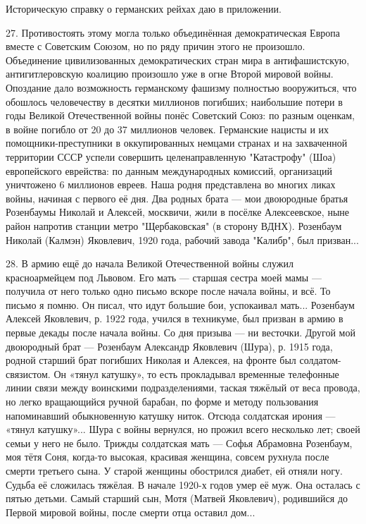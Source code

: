 Историческую справку о германских рейхах даю в приложении.

27. Противостоять этому могла только объединённая демократическая Европа вместе с Советским Союзом, но по ряду причин этого не произошло. Объединение цивилизованных демократических стран мира в антифашистскую, антигитлеровскую коалицию произошло уже в огне Второй мировой войны. Опоздание дало возможность германскому фашизму полностью вооружиться, что обошлось человечеству в десятки миллионов погибших; наибольшие потери в годы Великой Отечественной войны понёс Советский Союз: по разным оценкам, в войне погибло от 20 до 37 миллионов человек. Германские нацисты и их помощники-преступники в оккупированных немцами странах и на захваченной территории СССР успели совершить целенаправленную "Катастрофу" (Шоа) европейского еврейства: по данным международных комиссий, организаций уничтожено 6 миллионов евреев. Наша родня представлена во многих ликах войны, начиная с первого её дня. Два родных брата — мои двоюродные братья Розенбаумы Николай и Алексей, москвичи, жили в посёлке Алексеевское, ныне район напротив станции метро "Щербаковская" (в сторону ВДНХ). Розенбаум Николай (Калмэн) Яковлевич, 1920 года, рабочий завода "Калибр", был призван...

28. В армию ещё до начала Великой Отечественной войны служил красноармейцем под Львовом. Его мать — старшая сестра моей мамы — получила от него только одно письмо вскоре после начала войны, и всё. То письмо я помню. Он писал, что идут большие бои, успокаивал мать... Розенбаум Алексей Яковлевич, р. 1922 года, учился в техникуме, был призван в армию в первые декады после начала войны. Со дня призыва — ни весточки. Другой мой двоюродный брат — Розенбаум Александр Яковлевич (Шура), р. 1915 года, родной старший брат погибших Николая и Алексея, на фронте был солдатом-связистом. Он «тянул катушку», то есть прокладывал временные телефонные линии связи между воинскими подразделениями, таская тяжёлый от веса провода, но легко вращающийся ручной барабан, по форме и методу пользования напоминавший обыкновенную катушку ниток. Отсюда солдатская ирония — «тянул катушку»... Шура с войны вернулся, но прожил всего несколько лет; своей семьи у него не было. Трижды солдатская мать — Софья Абрамовна Розенбаум, моя тётя Соня, когда-то высокая, красивая женщина, совсем рухнула после смерти третьего сына. У старой женщины обострился диабет, ей отняли ногу. Судьба её сложилась тяжёлая. В начале 1920-х годов умер её муж. Она осталась с пятью детьми. Самый старший сын, Мотя (Матвей Яковлевич), родившийся до Первой мировой войны, после смерти отца оставил дом...

